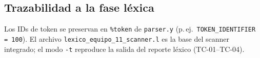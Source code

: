 \subsection{Trazabilidad a la fase léxica}
Los IDs de token se preservan en \texttt{\%token} de \texttt{parser.y} (p.\,ej.\ \texttt{TOKEN\_IDENTIFIER = 100}). El archivo \texttt{lexico\_equipo\_11\_scanner.l} es la base del scanner integrado; el modo \texttt{-t} reproduce la salida del reporte léxico (TC-01--TC-04).
